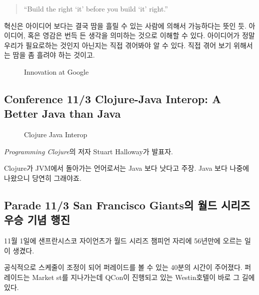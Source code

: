 \documentclass[a4paper]{article}
\begin{document}
\begin{quote}
``Build the right `it' before you build `it' right.''
\end{quote}
 
혁신은 아이디어 보다는 결국 땀을 흘릴 수 있는 사람에 의해서 가능하다는 뜻인 듯.
아이디어, 혹은 영감은 번득 든 생각을 의미하는 것으로 이해할 수 있다. 
아이디어가 정말 우리가 필요로하는 것인지 아닌지는 직접 겪어봐야 알 수 있다.
직접 겪어 보기 위해서는 땀을 좀 흘려야 하는 것이고.

\begin{figure}[t]
    \begin{Frame}
        \begin{center}
        \end{center}
    \end{Frame}
    \caption{Innovation at Google}
    \label{pretotyping}
\end{figure}

\subsection{Conference 11/3 Clojure-Java Interop: A Better Java than Java}

\begin{figure}[t]
    \begin{Frame}
        \begin{center}
        \end{center}
    \end{Frame}
    \caption{Clojure Java Interop}
    \label{clojure java}
\end{figure}

\textit{Programming Clojure}의 저자 Stuart Halloway가 발표자.
 
Clojure가 JVM에서 돌아가는 언어로서는 Java 보다 낫다고 주장. Java 보다
나중에 나왔으니 당연히 그래야죠.
 
\subsection{Parade 11/3 San Francisco Giants의 월드 시리즈 우승 기념 행진}
 
11월 1일에 샌프란시스코 자이언츠가 월드 시리즈 챔피언 자리에
56년만에 오르는 일이 생겼다. 

공식적으로 스케줄이 조정이 되어 퍼레이드를 볼 수 있는 40분의 시간이
주어졌다.  퍼레이드는 Market st를 지나가는데 QCon이 진행되고 있는
Westin호텔이 바로 그 길에 있다.
 
\end{document}
